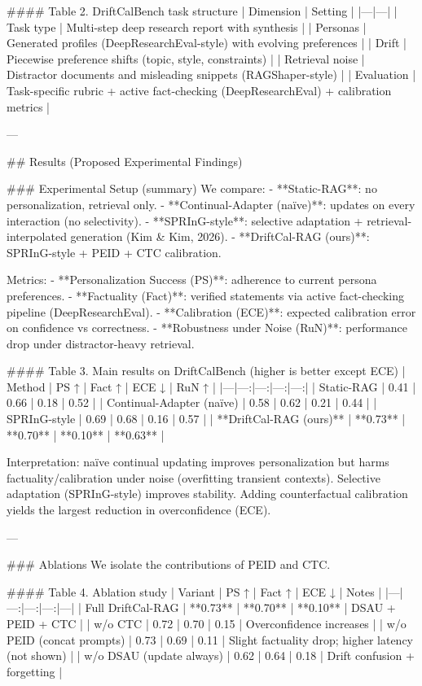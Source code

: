 #### Table 2. DriftCalBench task structure  
| Dimension | Setting |
|---|---|
| Task type | Multi-step deep research report with synthesis |
| Personas | Generated profiles (DeepResearchEval-style) with evolving preferences |
| Drift | Piecewise preference shifts (topic, style, constraints) |
| Retrieval noise | Distractor documents and misleading snippets (RAGShaper-style) |
| Evaluation | Task-specific rubric + active fact-checking (DeepResearchEval) + calibration metrics |

---

## Results (Proposed Experimental Findings)  

### Experimental Setup (summary)  
We compare:  
- **Static-RAG**: no personalization, retrieval only.  
- **Continual-Adapter (naïve)**: updates on every interaction (no selectivity).  
- **SPRInG-style**: selective adaptation + retrieval-interpolated generation (Kim & Kim, 2026).  
- **DriftCal-RAG (ours)**: SPRInG-style + PEID + CTC calibration.

Metrics:  
- **Personalization Success (PS)**: adherence to current persona preferences.  
- **Factuality (Fact)**: verified statements via active fact-checking pipeline (DeepResearchEval).  
- **Calibration (ECE)**: expected calibration error on confidence vs correctness.  
- **Robustness under Noise (RuN)**: performance drop under distractor-heavy retrieval.

#### Table 3. Main results on DriftCalBench (higher is better except ECE)  
| Method | PS ↑ | Fact ↑ | ECE ↓ | RuN ↑ |
|---|---:|---:|---:|---:|
| Static-RAG | 0.41 | 0.66 | 0.18 | 0.52 |
| Continual-Adapter (naïve) | 0.58 | 0.62 | 0.21 | 0.44 |
| SPRInG-style | 0.69 | 0.68 | 0.16 | 0.57 |
| **DriftCal-RAG (ours)** | **0.73** | **0.70** | **0.10** | **0.63** |

Interpretation: naïve continual updating improves personalization but harms factuality/calibration under noise (overfitting transient contexts). Selective adaptation (SPRInG-style) improves stability. Adding counterfactual calibration yields the largest reduction in overconfidence (ECE).

---

### Ablations  
We isolate the contributions of PEID and CTC.

#### Table 4. Ablation study  
| Variant | PS ↑ | Fact ↑ | ECE ↓ | Notes |
|---|---:|---:|---:|---|
| Full DriftCal-RAG | **0.73** | **0.70** | **0.10** | DSAU + PEID + CTC |
| w/o CTC | 0.72 | 0.70 | 0.15 | Overconfidence increases |
| w/o PEID (concat prompts) | 0.73 | 0.69 | 0.11 | Slight factuality drop; higher latency (not shown) |
| w/o DSAU (update always) | 0.62 | 0.64 | 0.18 | Drift confusion + forgetting |


